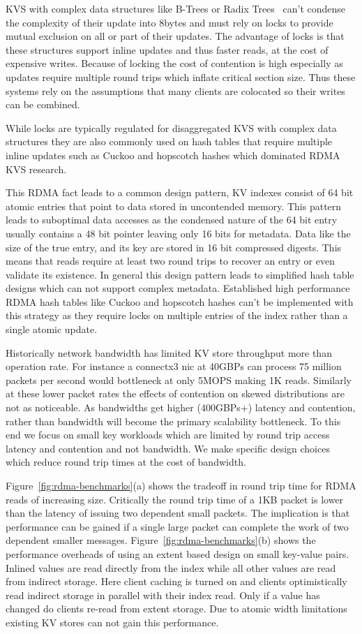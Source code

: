 KVS with complex data structures like B-Trees or Radix Trees~\cite{Sherman,smart} can't condense the
complexity of their update into 8bytes and must rely on locks to provide mutual exclusion on all or
part of their updates. The advantage of locks is that these structures support inline updates and
thus faster reads, at the cost of expensive writes. Because of locking the cost of contention is
high especially as updates require multiple round trips which inflate critical section size. Thus
these systems rely on the assumptions that many clients are colocated so their writes can be
combined.

While locks are typically regulated for disaggregated KVS with complex data structures they are also
commonly used on hash tables that require multiple inline updates such as Cuckoo and hopscotch
hashes which dominated RDMA KVS research.

This RDMA fact leads to a common design
pattern, KV indexes consist of 64 bit atomic entries that point to data stored in uncontended
memory. This pattern leads to suboptimal data accesses as the condensed nature of the 64 bit entry
usually contains a 48 bit pointer leaving only 16 bits for metadata. Data like the size of the true
entry, and its key are stored in 16 bit compressed digests. This means that reads require at least
two round trips to recover an entry or even validate its existence. In general this design pattern
leads to simplified hash table designs which can not support complex metadata. Established high
performance RDMA hash tables like Cuckoo and hopscotch hashes can’t be implemented with this
strategy as they require locks on multiple entries of the index rather than a single atomic update.

Historically network bandwidth has limited KV store throughput more than operation rate. For
instance a connectx3 nic at 40GBPs can process 75 million packets per second would bottleneck at
only 5MOPS making 1K reads. Similarly at these lower packet rates the effects of contention on
skewed distributions are not as noticeable. As bandwidths get higher (400GBPs+) latency and
contention, rather than bandwidth will become the primary scalability bottleneck. To this end we
focus on small key workloads which are limited by round trip access latency and contention and not
bandwidth. We make specific design choices which reduce round trip times at the cost of bandwidth.

Figure~\ref{fig:rdma-benchmarks}(a) shows the tradeoff in round trip time for RDMA reads of
increasing size. Critically the round trip time of a 1KB packet is lower than the latency of issuing
two dependent small packets.  The implication is that performance can be gained if a single large
packet can complete the work of two dependent smaller messages. Figure~\ref{fig:rdma-benchmarks}(b)
shows the performance overheads of using an extent based design on small key-value pairs. Inlined
values are read directly from the index while all other values are read from indirect storage. Here
client caching is turned on and clients optimistically read indirect storage in parallel with their
index read. Only if a value has changed do clients re-read from extent storage. Due to atomic width
limitations existing KV stores can not gain this performance.


